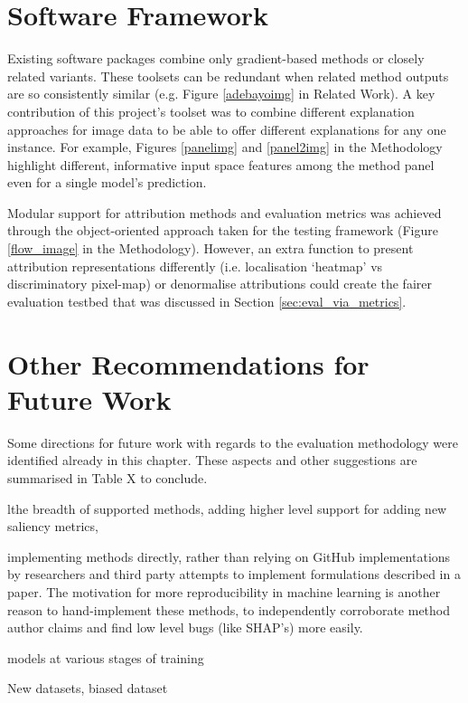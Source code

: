 \documentclass[main]{subfiles}
\begin{document}
\section{Software Framework}

Existing software packages combine only gradient-based methods or closely related variants. These toolsets can be redundant when related method outputs are so consistently similar (e.g. Figure \ref{adebayoimg} in Related Work). A key contribution of this project's toolset was to combine different explanation approaches for image data to be able to offer different explanations for any one instance. For example, Figures \ref{panelimg} and \ref{panel2img} in the Methodology highlight different, informative input space features among the method panel even for a single model's prediction.

Modular support for attribution methods and evaluation metrics was achieved through the object-oriented approach taken for the testing framework (Figure \ref{flow_image} in the Methodology). However, an extra function to present attribution representations differently (i.e. localisation `heatmap' vs discriminatory pixel-map) or denormalise attributions could create the fairer evaluation testbed that was discussed in Section \ref{sec:eval_via_metrics}.


\section{Other Recommendations for Future Work}


Some directions for future work with regards to the evaluation methodology were identified already in this chapter. These aspects and other suggestions are summarised in Table X to conclude.


lthe breadth of supported methods, adding higher level support for adding new saliency metrics, 

implementing methods directly, rather than relying on GitHub implementations by researchers and third party attempts to implement formulations described in a paper. The motivation for more reproducibility in machine learning is another reason to hand-implement these methods, to independently corroborate method author claims and find low level bugs (like SHAP's) more easily.

models at various stages of training

New datasets, biased dataset
\end{document}
